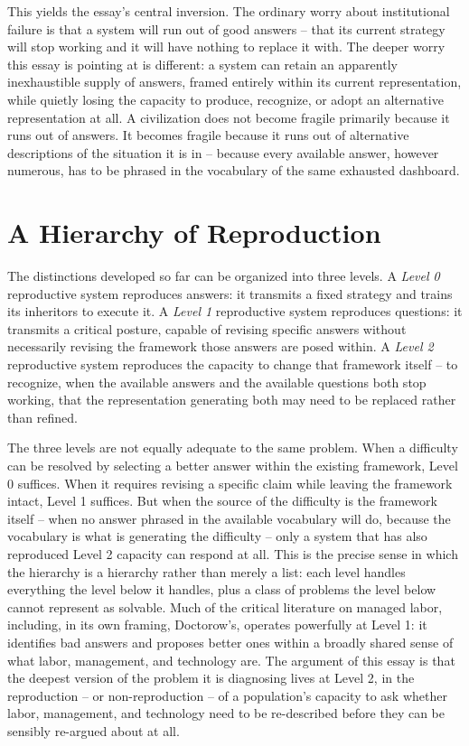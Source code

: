 \documentclass[11pt]{article}
\theoremstyle{plain}
\begin{document}
This yields the essay's central inversion. The ordinary worry about institutional failure is that a system will run out of good answers -- that its current strategy will stop working and it will have nothing to replace it with. The deeper worry this essay is pointing at is different: a system can retain an apparently inexhaustible supply of answers, framed entirely within its current representation, while quietly losing the capacity to produce, recognize, or adopt an alternative representation at all. A civilization does not become fragile primarily because it runs out of answers. It becomes fragile because it runs out of alternative descriptions of the situation it is in -- because every available answer, however numerous, has to be phrased in the vocabulary of the same exhausted dashboard.

\section{A Hierarchy of Reproduction}
\label{sec:hierarchy}

The distinctions developed so far can be organized into three levels. A \emph{Level 0} reproductive system reproduces answers: it transmits a fixed strategy and trains its inheritors to execute it. A \emph{Level 1} reproductive system reproduces questions: it transmits a critical posture, capable of revising specific answers without necessarily revising the framework those answers are posed within. A \emph{Level 2} reproductive system reproduces the capacity to change that framework itself -- to recognize, when the available answers and the available questions both stop working, that the representation generating both may need to be replaced rather than refined.

The three levels are not equally adequate to the same problem. When a difficulty can be resolved by selecting a better answer within the existing framework, Level 0 suffices. When it requires revising a specific claim while leaving the framework intact, Level 1 suffices. But when the source of the difficulty is the framework itself -- when no answer phrased in the available vocabulary will do, because the vocabulary is what is generating the difficulty -- only a system that has also reproduced Level 2 capacity can respond at all. This is the precise sense in which the hierarchy is a hierarchy rather than merely a list: each level handles everything the level below it handles, plus a class of problems the level below cannot represent as solvable. Much of the critical literature on managed labor, including, in its own framing, Doctorow's, operates powerfully at Level 1: it identifies bad answers and proposes better ones within a broadly shared sense of what labor, management, and technology are. The argument of this essay is that the deepest version of the problem it is diagnosing lives at Level 2, in the reproduction -- or non-reproduction -- of a population's capacity to ask whether labor, management, and technology need to be re-described before they can be sensibly re-argued about at all.
\end{document}
